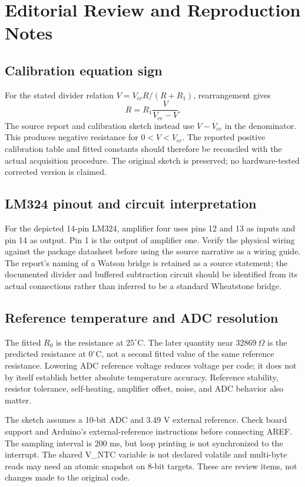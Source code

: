 \documentclass[11pt,a4paper]{article}
\begin{document}
\section{Editorial Review and Reproduction Notes}
\subsection{Calibration equation sign}
For the stated divider relation $V=V_{cc}R/(R+R_1)$, rearrangement gives
\[R=R_1\frac{V}{V_{cc}-V}.\]
The source report and calibration sketch instead use $V-V_{cc}$ in the denominator. This produces negative resistance for $0<V<V_{cc}$. The reported positive calibration table and fitted constants should therefore be reconciled with the actual acquisition procedure. The original sketch is preserved; no hardware-tested corrected version is claimed.
\subsection{LM324 pinout and circuit interpretation}
For the depicted 14-pin LM324, amplifier four uses pins 12 and 13 as inputs and pin 14 as output. Pin 1 is the output of amplifier one. Verify the physical wiring against the package datasheet before using the source narrative as a wiring guide. The report's naming of a Watson bridge is retained as a source statement; the documented divider and buffered subtraction circuit should be identified from its actual connections rather than inferred to be a standard Wheatstone bridge.
\subsection{Reference temperature and ADC resolution}
The fitted $R_0$ is the resistance at $25^\circ$C. The later quantity near $32869\ \Omega$ is the predicted resistance at $0^\circ$C, not a second fitted value of the same reference resistance. Lowering ADC reference voltage reduces voltage per code; it does not by itself establish better absolute temperature accuracy. Reference stability, resistor tolerance, self-heating, amplifier offset, noise, and ADC behavior also matter.

The sketch assumes a 10-bit ADC and 3.49 V external reference. Check board support and Arduino's external-reference instructions before connecting AREF. The sampling interval is 200 ms, but loop printing is not synchronized to the interrupt. The shared V\_NTC variable is not declared volatile and multi-byte reads may need an atomic snapshot on 8-bit targets. These are review items, not changes made to the original code.
\end{document}
